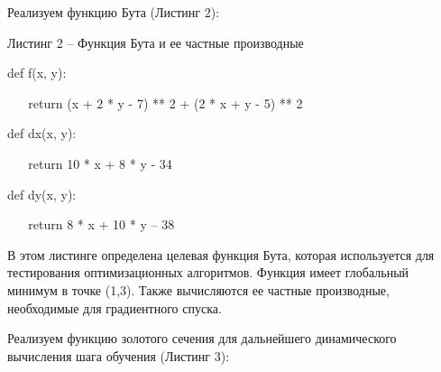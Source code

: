 \documentclass{article}%
\begin{document}
\begin{enumerate}
\begin{flushleft}
Реализуем функцию Бута (Листинг 2):%
%
\end{flushleft}%
\begin{flushleft}%
Листинг 2 – Функция Бута и ее частные производные%
%
\end{flushleft}%
\begin{flushleft}%
def f(x, y):%
%
\end{flushleft}%
\begin{flushleft}%
    return (x + 2 * y - 7) ** 2 + (2 * x + y - 5) ** 2%
%
\end{flushleft}%
\begin{flushleft}%
def dx(x, y):%
%
\end{flushleft}%
\begin{flushleft}%
    return 10 * x + 8 * y - 34%
%
\end{flushleft}%
\begin{flushleft}%
def dy(x, y):%
%
\end{flushleft}%
\begin{flushleft}%
    return 8 * x + 10 * y – 38%
%
\end{flushleft}%
\begin{flushleft}%
В этом листинге определена целевая функция Бута, которая используется для тестирования оптимизационных алгоритмов.
Функция имеет глобальный минимум в точке (1,3).
Также вычисляются ее частные производные, необходимые для градиентного спуска.%
%
\end{flushleft}%
\begin{flushleft}%
	Реализуем функцию золотого сечения для дальнейшего динамического вычисления шага обучения (Листинг 3):%
%
\end{flushleft}%
\begin{flushleft}%

\end{flushleft}
\end{enumerate}
\end{document}
